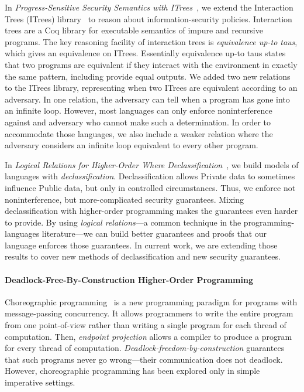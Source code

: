 \documentclass{article}
\theoremstyle{definition}
\begin{document}
In \textit{Progress-Sensitive Security Semantics with ITrees}~\citep{SilverHHCZ22}, we extend the Interaction Trees (ITrees) library~\citep{XiaZHHMPZ20} to reason about information-security policies.
Interaction trees are a Coq library for executable semantics of impure and recursive programs.
The key reasoning facility of interaction trees is \emph{equivalence up-to taus}, which gives an equivalence on ITrees.
Essentially equivalence up-to taus states that two programs are equivalent if they interact with the environment in exactly the same pattern, including provide equal outputs.
We added two new relations to the ITrees library, representing when two ITrees are equivalent according to an adversary.
In one relation, the adversary can tell when a program has gone into an infinite loop.
However, most languages can only enforce noninterference against and adversary who cannot make such a determination.
In order to accommodate those languages, we also include a weaker relation where the adversary considers an infinite loop equivalent to every other program.

In \textit{Logical Relations for Higher-Order Where Declassification}~\citep{MenzHLG22}, we build models of languages with \emph{declassification}.
Declassification allows \textsf{Private} data to sometimes influence \textsf{Public} data, but only in controlled circumstances.
Thus, we enforce not noninterference, but more-complicated security guarantees.
Mixing declassification with higher-order programming makes the guarantees even harder to provide.
By using \emph{logical relations}---a common technique in the programming-languages literature---we can build better guarantees and proofs that our language enforces those guarantees.
In current work, we are extending those results to cover new methods of declassification and new security guarantees.

\paragraph{Deadlock-Free-By-Construction Higher-Order Programming}
Choreographic programming~\citep{Montesi13} is a new programming paradigm for programs with message-passing concurrency.
It allows programmers to write the entire program from one point-of-view rather than writing a single program for each thread of computation.
Then, \emph{endpoint projection} allows a compiler to produce a program for every thread of computation.
\emph{Deadlock-freedom-by-construction} guarantees that such programs never go wrong---their communication does not deadlock.
However, choreographic programming has been explored only in simple imperative settings.
\end{document}
